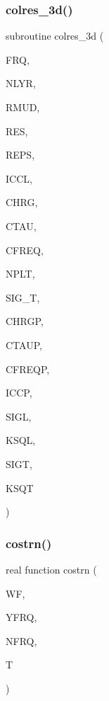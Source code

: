 \mbox{\label{Leroi__c_8f90_a61eed94d3789d0474014a2cd34a792c6}} 
\subsubsection{\texorpdfstring{colres\+\_\+3d()}{colres\_3d()}}
{\footnotesize\ttfamily subroutine colres\+\_\+3d (\begin{DoxyParamCaption}\item[{real}]{F\+RQ,  }\item[{integer}]{N\+L\+YR,  }\item[{real(kind=ql), dimension(0\+:nlyr)}]{R\+M\+UD,  }\item[{real, dimension(nlyr)}]{R\+ES,  }\item[{real, dimension(nlyr)}]{R\+E\+PS,  }\item[{integer, dimension(nlyr)}]{I\+C\+CL,  }\item[{real, dimension(nlyr)}]{C\+H\+RG,  }\item[{real, dimension(nlyr)}]{C\+T\+AU,  }\item[{real, dimension(nlyr)}]{C\+F\+R\+EQ,  }\item[{integer}]{N\+P\+LT,  }\item[{real, dimension(nplt)}]{S\+I\+G\+\_\+T,  }\item[{real, dimension(nplt)}]{C\+H\+R\+GP,  }\item[{real, dimension(nplt)}]{C\+T\+A\+UP,  }\item[{real, dimension(nplt)}]{C\+F\+R\+E\+QP,  }\item[{integer, dimension(nplt)}]{I\+C\+CP,  }\item[{complex(kind=ql), dimension(nlyr)}]{S\+I\+GL,  }\item[{complex(kind=ql), dimension(nlyr)}]{K\+S\+QL,  }\item[{complex, dimension(nplt)}]{S\+I\+GT,  }\item[{complex, dimension(nplt)}]{K\+S\+QT }\end{DoxyParamCaption})}

\mbox{\label{Leroi__c_8f90_a12a40dde1170214455093566ef5e8bb4}} 
\subsubsection{\texorpdfstring{costrn()}{costrn()}}
{\footnotesize\ttfamily real function costrn (\begin{DoxyParamCaption}\item[{real, dimension(nfrq), intent(in)}]{WF,  }\item[{real, dimension(4,nfrq), intent(in)}]{Y\+F\+RQ,  }\item[{integer, intent(in)}]{N\+F\+RQ,  }\item[{real, intent(in)}]{T }\end{DoxyParamCaption})}

